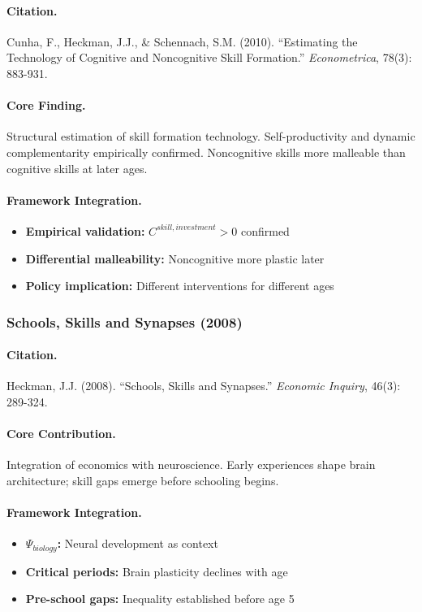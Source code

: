 \documentclass[12pt,a4paper]{article}
\begin{document}
\paragraph{Citation.}
Cunha, F., Heckman, J.J., \& Schennach, S.M. (2010). ``Estimating the
Technology of Cognitive and Noncognitive Skill Formation.''
\emph{Econometrica}, 78(3): 883-931.

\paragraph{Core Finding.}
Structural estimation of skill formation technology. Self-productivity
and dynamic complementarity empirically confirmed. Noncognitive skills
more malleable than cognitive skills at later ages.

\paragraph{Framework Integration.}
\begin{itemize}
  \item \textbf{Empirical validation:} $C^{skill,investment} > 0$ confirmed
  \item \textbf{Differential malleability:} Noncognitive more plastic later
  \item \textbf{Policy implication:} Different interventions for different ages
\end{itemize}

\subsubsection{Schools, Skills and Synapses (2008)}

\paragraph{Citation.}
Heckman, J.J. (2008). ``Schools, Skills and Synapses.''
\emph{Economic Inquiry}, 46(3): 289-324.

\paragraph{Core Contribution.}
Integration of economics with neuroscience. Early experiences shape
brain architecture; skill gaps emerge before schooling begins.

\paragraph{Framework Integration.}
\begin{itemize}
  \item \textbf{$\Psi_{biology}$:} Neural development as context
  \item \textbf{Critical periods:} Brain plasticity declines with age
  \item \textbf{Pre-school gaps:} Inequality established before age 5
\end{itemize}
\end{document}
